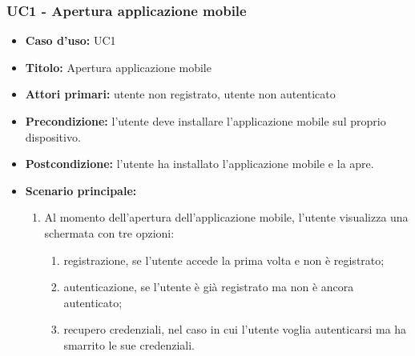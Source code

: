 \documentclass[casi-duso]{subfiles}
\begin{document}
\subsubsection{UC1 - Apertura applicazione mobile}
\label{subsub:uc1utente}
\begin{itemize}
  \item \textbf{Caso d’uso:} UC1 
  \item \textbf{Titolo:} Apertura applicazione mobile
  \item \textbf{Attori primari:} utente non registrato, utente non autenticato
  \item \textbf{Precondizione:} l'utente deve installare l'applicazione mobile sul proprio dispositivo.
  \item \textbf{Postcondizione:} l'utente ha installato l'applicazione mobile e la apre.
  \item \textbf{Scenario principale:} 
  \begin{enumerate}
    \item Al momento dell'apertura dell'applicazione mobile, l'utente visualizza una schermata con tre opzioni:
    \begin{enumerate}
      \item registrazione, se l'utente accede la prima volta e non è registrato;
      \item autenticazione, se l'utente è già registrato ma non è ancora autenticato;
      \item recupero credenziali, nel caso in cui l'utente voglia autenticarsi ma ha smarrito le sue credenziali.
    \end{enumerate}
  \end{enumerate}   
\end{itemize}

\end{document}
